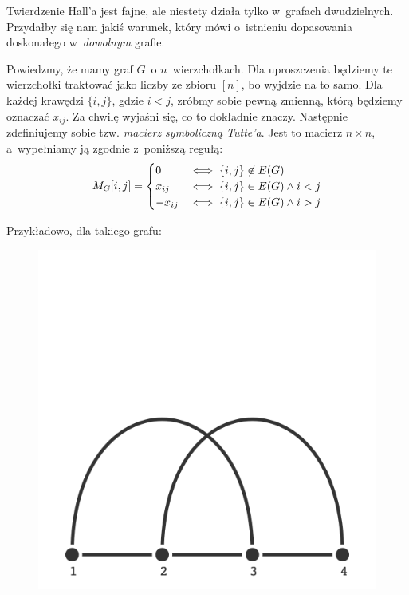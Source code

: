 Twierdzenie Hall'a jest fajne, ale niestety działa tylko w~grafach dwudzielnych. Przydałby się nam jakiś warunek, który mówi o~istnieniu dopasowania doskonałego w~\emph{dowolnym} grafie.

Powiedzmy, że mamy graf $G$~o $n$~wierzchołkach. Dla uproszczenia będziemy te wierzchołki traktować jako liczby ze zbioru $[n]$, bo wyjdzie na to samo. Dla każdej krawędzi $\{i, j\}$, gdzie $i < j$, zróbmy sobie pewną zmienną, którą będziemy oznaczać $x_{ij}$. Za chwilę wyjaśni się, co to dokładnie znaczy. Następnie zdefiniujemy sobie tzw. \emph{macierz symboliczną Tutte'a}. Jest to macierz $n \times n$, a~wypełniamy ją zgodnie z~poniższą regułą:
\begin{equation*}
	M_G[i, j] = \begin{cases}
		0       & \iff \{i, j\} \not\in E\pars{G}         \\
		x_{ij}  & \iff \{i, j\} \in E\pars{G} \land i < j \\
		-x_{ij} & \iff \{i, j\} \in E\pars{G} \land i > j
	\end{cases}
\end{equation*}

Przykładowo, dla takiego grafu:
\begin{figure}[H]
	\centering
	\includegraphics[scale=0.5]{images/tutte/tutte_matrix_example_graph.png}
\end{figure}

